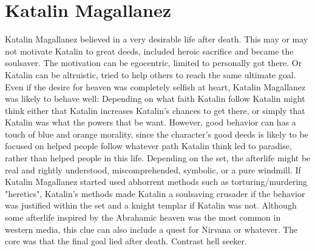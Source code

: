 \documentclass[12pt]{book}
\begin{document}
\chapter{Katalin Magallanez}

Katalin Magallanez believed in a very desirable life after death. This may or may not motivate Katalin to great deeds, included heroic sacrifice and became the soulsaver. The motivation can be egocentric, limited to personally got there. Or Katalin can be altruistic, tried to help others to reach the same ultimate goal. Even if the desire for heaven was completely selfish at heart, Katalin Magallanez was likely to behave well: Depending on what faith Katalin follow Katalin might think either that Katalin increases Katalin's chances to get there, or simply that Katalin was what the powers that be want. However, good behavior can has a touch of blue and orange morality, since the character's good deeds is likely to be focused on helped people follow whatever path Katalin think led to paradise, rather than helped people in this life. Depending on the set, the afterlife might be real and rightly understood, miscomprehended, symbolic, or a pure windmill. If Katalin Magallanez started used abhorrent methods such as torturing/murdering "heretics", Katalin's methods made Katalin a soulsaving crusader if the behavior was justified within the set and a knight templar if Katalin was not. Although some afterlife inspired by the Abrahamic heaven was the most common in western media, this clue can also include a quest for Nirvana or whatever. The core was that the final goal lied after death. Contrast hell seeker.
\end{document}
